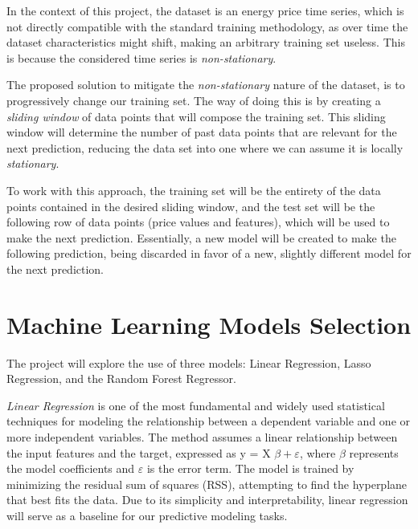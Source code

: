 \documentclass[12pt]{report} %
\begin{document}
In the context of this project, the dataset is an energy price time series, which is not directly compatible with the standard training methodology, as over time the dataset characteristics might shift, making an arbitrary training set useless. This is because the considered time series is \textit{non-stationary}.

The proposed solution to mitigate the \textit{non-stationary} nature of the dataset, is to progressively change our training set. The way of doing this is by creating a \textit{sliding window} of data points that will compose the training set. This sliding window will determine the number of past data points that are relevant for the next prediction, reducing the data set into one where we can assume it is locally \textit{stationary}.

To work with this approach, the training set will be the entirety of the data points contained in the desired sliding window, and the test set will be the following row of data points (price values and features), which will be used to make the next prediction. Essentially, a new model will be created to make the following prediction, being discarded in favor of a new, slightly different model for the next prediction.


\section{Machine Learning Models Selection}

The project will explore the use of three models: Linear Regression, Lasso Regression, and the Random Forest Regressor.

\textit{Linear Regression} \cite{linear_regression} is one of the most fundamental and widely used statistical techniques for modeling the relationship between a dependent variable and one or more independent variables. The method assumes a linear relationship between the input features and the target, expressed as y = X $\beta + \varepsilon $, where $\beta$ represents the model coefficients and $\varepsilon$ is the error term. The model is trained by minimizing the residual sum of squares (RSS), attempting to find the hyperplane that best fits the data. Due to its simplicity and interpretability, linear regression will serve as a baseline for our predictive modeling tasks.
\end{document}
